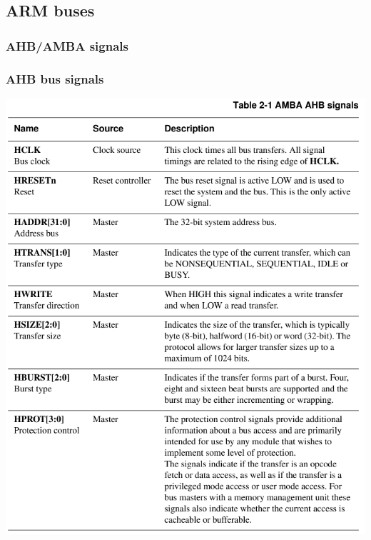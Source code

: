 \documentclass[a4paper]{scrartcl}
\begin{document}
    \subsection{ARM buses}
        \subsubsection{AHB/AMBA signals}
        \subsubsection*{AHB bus signals}
        \centering\includegraphics[scale=0.4]{amba1.png}
\end{document}
